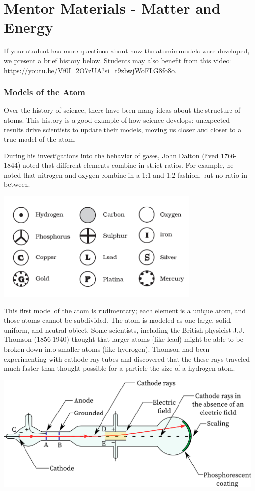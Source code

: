 \chapter{Mentor Materials - Matter and Energy}

If your student has more questions about how the atomic models were developed, 
we present a brief history below. Students may also benefit from this video: 
https://youtu.be/Vf0I_2O7zUA?si=t9zbwjWoFLG8fo8o.


\subsection{Models of the Atom}
Over the history of science, there have been many ideas about the structure of
atoms. This history is a good example of how science develops: unexpected
results drive scientists to update their models, moving us closer and closer to
a true model of the atom.

During his investigations into the behavior of gases,
John Dalton (lived 1766-1844) noted that different elements combine in strict
ratios. For example, he noted that nitrogen and oxygen combine in a 1:1 and 1:2
fashion, but no ratio in between.

\includegraphics[width=0.75\textwidth]{daltons_model.png}

This first model of the atom is rudimentary; each element is a unique atom,
and those atoms cannot be subdivided. The atom is modeled as one large, solid, 
uniform, and neutral object. Some scientists, including the British physicist 
J.J. Thomson (1856-1940) thought that larger atoms (like lead) might be able 
to be broken down into smaller atoms (like hydrogen). Thomson had been 
experimenting with cathode-ray tubes and discovered that the these rays 
traveled much faster than thought possible for a particle the size of a 
hydrogen atom.

\includegraphics[width=1\textwidth]{cathode-ray-tube.png}

